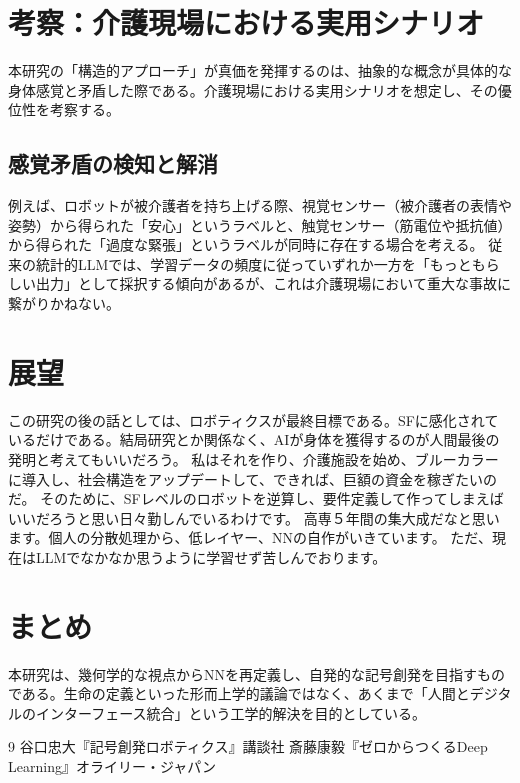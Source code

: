 \documentclass[a4j, twocolumn]{article}
\begin{document}
\section{考察：介護現場における実用シナリオ}
本研究の「構造的アプローチ」が真価を発揮するのは、抽象的な概念が具体的な身体感覚と矛盾した際である。介護現場における実用シナリオを想定し、その優位性を考察する。

\subsection{感覚矛盾の検知と解消}
例えば、ロボットが被介護者を持ち上げる際、視覚センサー（被介護者の表情や姿勢）から得られた「安心」というラベルと、触覚センサー（筋電位や抵抗値）から得られた「過度な緊張」というラベルが同時に存在する場合を考える。
従来の統計的LLMでは、学習データの頻度に従っていずれか一方を「もっともらしい出力」として採択する傾向があるが、これは介護現場において重大な事故に繋がりかねない。

\section{展望}
この研究の後の話としては、ロボティクスが最終目標である。SFに感化されているだけである。結局研究とか関係なく、AIが身体を獲得するのが人間最後の発明と考えてもいいだろう。
私はそれを作り、介護施設を始め、ブルーカラーに導入し、社会構造をアップデートして、できれば、巨額の資金を稼ぎたいのだ。
そのために、SFレベルのロボットを逆算し、要件定義して作ってしまえばいいだろうと思い日々勤しんでいるわけです。
高専５年間の集大成だなと思います。個人の分散処理から、低レイヤー、NNの自作がいきています。
ただ、現在はLLMでなかなか思うように学習せず苦しんでおります。

\section{まとめ}
本研究は、幾何学的な視点からNNを再定義し、自発的な記号創発を目指すものである。生命の定義といった形而上学的議論ではなく、あくまで「人間とデジタルのインターフェース統合」という工学的解決を目的としている。

\begin{thebibliography}{9}
 谷口忠大『記号創発ロボティクス』講談社
 斎藤康毅『ゼロからつくるDeep Learning』オライリー・ジャパン
\end{thebibliography}
\end{document}

